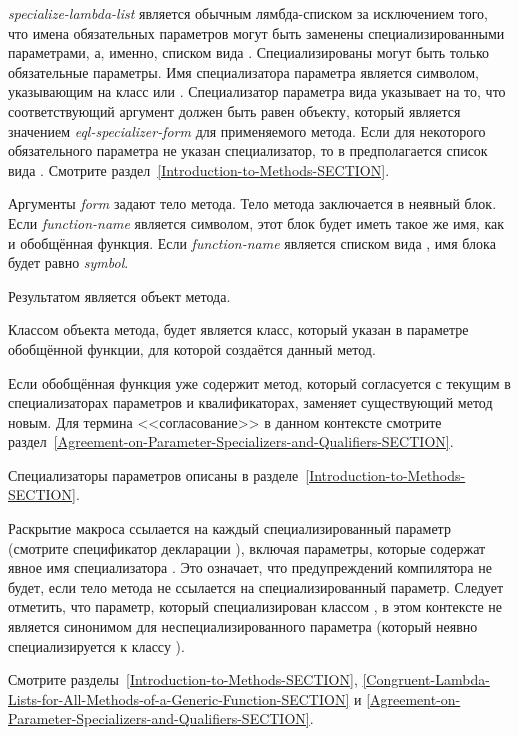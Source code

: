 \begin{defmac}
\emph{specialize-lambda-list} является обычным лямбда-списком за исключением
того, что имена обязательных параметров могут быть заменены специализированными
параметрами, а, именно, списком вида . Специализированы могут быть только обязательные
параметры. Имя специализатора параметра является символом, указывающим на класс
или . Специализатор параметра вида
 указывает на то, что соответствующий
аргумент должен быть равен  объекту, который является значением
\emph{eql-specializer-form} для применяемого метода. Если для некоторого
обязательного параметра не указан специализатор, то в предполагается список вида
. Смотрите
раздел~\ref{Introduction-to-Methods-SECTION}. 

Аргументы \emph{form} задают тело метода.
Тело метода заключается в неявный блок. Если \emph{function-name} является
символом, этот блок будет иметь такое же имя, как и обобщённая функция. Если
\emph{function-name} является списком вида , имя блока
будет равно \emph{symbol}.

Результатом  является объект метода.

Классом объекта метода, будет является класс, который указан в параметре
обобщённой функции, для которой создаётся данный метод.

Если обобщённая функция уже содержит метод, который согласуется с текущим в
специализаторах параметров и квалификаторах,  заменяет
существующий метод новым. Для термина <<согласование>> в данном контексте
смотрите раздел~\ref{Agreement-on-Parameter-Specializers-and-Qualifiers-SECTION}.

Специализаторы параметров описаны в разделе~\ref{Introduction-to-Methods-SECTION}.

Раскрытие макроса  ссылается на каждый специализированный
параметр (смотрите спецификатор декларации ), включая параметры,
которые содержат явное имя специализатора . Это означает, что
предупреждений компилятора не будет, если тело метода не ссылается на
специализированный параметр. Следует отметить, что параметр, который
специализирован классом , в этом контексте не является синонимом для
неспециализированного параметра (который неявно специализируется к классу
).

Смотрите разделы~\ref{Introduction-to-Methods-SECTION},
\ref{Congruent-Lambda-Lists-for-All-Methods-of-a-Generic-Function-SECTION} и
\ref{Agreement-on-Parameter-Specializers-and-Qualifiers-SECTION}. 
\end{defmac}


